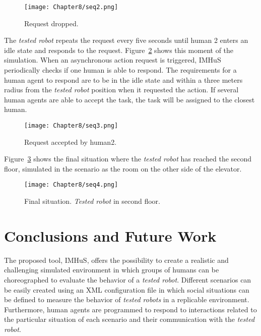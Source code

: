 \begin{figure}[!ht]
  \centering
  {\texttt{[image: Chapter8/seq2.png]}}
  \caption{Request dropped.}
  \label{fig:take_elevator_video_2}
\end{figure}

The \textit{tested robot} repeats the request every five seconds until human 2 enters an idle state and responds to the request. Figure~\ref{fig:take_elevator_video_3} shows this moment of the simulation. When an asynchronous action request is triggered, IMHuS  periodically checks if one human is able to respond. The requirements for a human agent to respond are to be in the idle state and within a three meters radius from the \textit{tested robot} position when it requested the action. If several human agents are able to accept the task, the task will be assigned to the closest human.

\begin{figure}[!ht]
  \centering
  {\texttt{[image: Chapter8/seq3.png]}}\\
  \caption{Request accepted by human2.}
  \label{fig:take_elevator_video_3}
\end{figure}

Figure~\ref{fig:take_elevator_video_4} shows the final situation where the \textit{tested robot} has reached the second floor, simulated in the scenario as the room on the other side of the elevator.

\begin{figure}[!ht]
  \centering
  {\texttt{[image: Chapter8/seq4.png]}}\\
  \caption{Final situation. \textit{Tested robot} in second floor.}
  \label{fig:take_elevator_video_4}
\end{figure}

\section{Conclusions and Future Work}
\label{sec:conclusions}

The proposed tool, IMHuS, offers the possibility to create a realistic and challenging simulated environment in which groups of humans can be choreographed to evaluate the behavior of a \textit{tested robot}. Different scenarios can be easily created using an XML configuration file in which social situations can be defined to measure the behavior of \textit{tested robots} in a replicable environment. Furthermore, human agents are programmed to respond to interactions related to the particular situation of each scenario and their communication with the \textit{tested robot}. 

